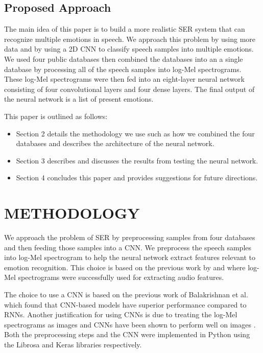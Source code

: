 \documentclass[a4paper, 10pt, conference]{ieeeconf}      %
\begin{document}
\subsection{Proposed Approach}

The main idea of this paper is to build a more realistic SER system that can recognize multiple emotions in speech. We approach this problem by using more data and by using a 2D CNN to classify speech samples into multiple emotions. We used four public databases then combined the databases into an a single database by processing all of the speech samples into log-Mel spectrograms. These log-Mel spectrograms were then fed into an eight-layer neural network consisting of four convolutional layers and four dense layers. The final output of the neural network is a list of present emotions.

This paper is outlined as follows:
\begin{itemize}
	\item Section 2 details the methodology we use such as how we combined the four databases and describes the architecture of the neural network.
	\item Section 3 describes and discusses the results from testing the neural network.
	\item Section 4 concludes this paper and provides suggestions for future directions.
\end{itemize}


\section{METHODOLOGY}

We approach the problem of SER by preprocessing samples from four databases and then feeding those samples into a CNN. We preprocess the speech samples into log-Mel spectrogram to help the neural network extract features relevant to emotion recognition. This choice is based on the previous work by \cite{Engel2019} and \cite{Badshah2017} where log-Mel spectrograms were successfully used for extracting audio features. 

The choice to use a CNN is based on the previous work of Balakrishnan et al. \cite{Balakrishnan2017} which found that CNN-based models have superior performance compared to RNNs. Another justification for using CNNs is due to treating the log-Mel spectrograms as images and CNNs have been shown to perform well on images \cite{Krizhevsky2012}. Both the preprocessing steps and the CNN were implemented in Python using the Librosa \cite{McFee2015} and Keras \cite{Chollet2015} libraries respectively.
\end{document}
